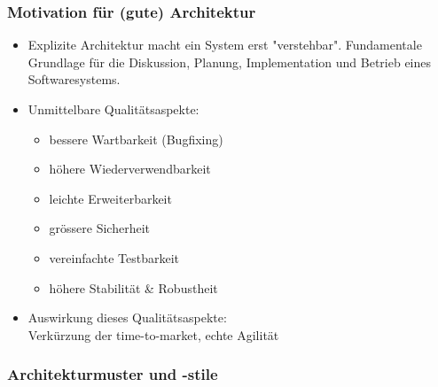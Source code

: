 \documentclass[a4paper]{article}
\begin{document}
			\subsubsection{Motivation für (gute) Architektur}
			
				\begin{itemize}
					\item Explizite Architektur macht ein System erst "verstehbar".
					Fundamentale Grundlage für die Diskussion, Planung, Implementation und Betrieb eines Softwaresystems.
					
					\item Unmittelbare Qualitätsaspekte:
					\begin{itemize}
						\item bessere Wartbarkeit (Bugfixing)
						\item höhere Wiederverwendbarkeit
						\item leichte Erweiterbarkeit
						\item grössere Sicherheit
						\item vereinfachte Testbarkeit
						\item höhere Stabilität \& Robustheit
					\end{itemize}
					
					\item Auswirkung dieses Qualitätsaspekte:\\
					Verkürzung der time-to-market, echte Agilität
				\end{itemize}
				
			\newpage	
		
			\subsubsection{Architekturmuster und -stile}
			
\end{document}
